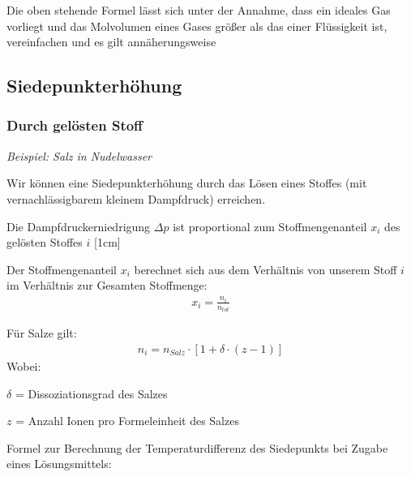 \documentclass[a4paper,10pt]{article}
\begin{document}
Die oben stehende Formel lässt sich unter der Annahme, dass ein ideales Gas vorliegt und das Molvolumen eines Gases größer als das einer Flüssigkeit ist, vereinfachen und es gilt annäherungsweise\par 
{}

\pagebreak
\subsection{Siedepunkterhöhung}
\subsubsection{Durch gelösten Stoff} 
\textit{Beispiel: Salz in Nudelwasser} \par 
Wir können eine Siedepunkterhöhung durch das Lösen eines Stoffes (mit vernachlässigbarem kleinem Dampfdruck) erreichen. \par Die Dampfdruckerniedrigung $\Delta p$ ist proportional zum Stoffmengenanteil $x_i$ des gelösten Stoffes $i$
\reversemarginpar
{}[1cm]
\pp
{}
\par \vspace*{2mm}
\color{miudiutex}

Der Stoffmengenanteil $x_i$ berechnet sich aus dem Verhältnis von unserem Stoff $i$ im Verhältnis zur Gesamten Stoffmenge:
\begin{align*}
x_i = \frac{n_i}{n_{tot}}
\end{align*}


Für Salze gilt:
\begin{align*}
n_i = n_{Salz} \cdot [1+ \delta \cdot (z-1)]
\end{align*}
Wobei: \par 
$\delta$ = Dissoziationsgrad des Salzes \par 
$z$ = Anzahl Ionen pro Formeleinheit des Salzes \pp

\ppbig
Formel zur Berechnung der Temperaturdifferenz des Siedepunkts bei Zugabe eines Lösungsmittels:
\end{document}

